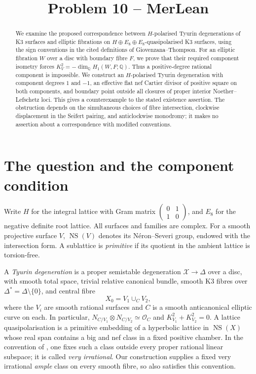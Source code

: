 \documentclass[11pt]{article}
\title{Problem 10 -- MerLean}
\author{}
\date{}
\theoremstyle{definition}
\theoremstyle{remark}
\newcommand{\Q}{\mathbb Q}
\newcommand{\NS}{\operatorname{NS}}
\newcommand{\OO}{\mathcal O}
\begin{document}
\maketitle

\begin{abstract}
We examine the proposed correspondence between $H$-polarised Tyurin degenerations of K3 surfaces and elliptic fibrations on $H\oplus E_8\oplus E_8$-quasipolarised K3 surfaces, using the sign conventions in the cited definitions of Giovenzana--Thompson. For an elliptic fibration $W$ over a disc with boundary fibre $F$, we prove that their required component isometry forces $K_V^2=-\dim_{\Q}H_1(W,F;\Q)$. Thus a positive-degree rational component is impossible. We construct an $H$-polarised Tyurin degeneration with component degrees $1$ and $-1$, an effective flat nef Cartier divisor of positive square on both components, and boundary point outside all closures of proper interior Noether--Lefschetz loci. This gives a counterexample to the stated existence assertion. The obstruction depends on the simultaneous choices of fibre intersection, clockwise displacement in the Seifert pairing, and anticlockwise monodromy; it makes no assertion about a correspondence with modified conventions.
\end{abstract}

\section{The question and the component condition}

Write $H$ for the integral lattice with Gram matrix $\left(\begin{smallmatrix}0&1\\1&0\end{smallmatrix}\right)$, and $E_8$ for the negative definite root lattice. All surfaces and families are complex. For a smooth projective surface $V$, $\NS(V)$ denotes its N\'eron--Severi group, endowed with the intersection form. A sublattice is \emph{primitive} if its quotient in the ambient lattice is torsion-free.

A \emph{Tyurin degeneration} is a proper semistable degeneration $\mathcal X\to\Delta$ over a disc, with smooth total space, trivial relative canonical bundle, smooth K3 fibres over $\Delta^*=\Delta\setminus\{0\}$, and central fibre
\[
X_0=V_1\cup_C V_2,
\]
where the $V_i$ are smooth rational surfaces and $C$ is a smooth anticanonical elliptic curve on each. In particular, $N_{C/V_1}\otimes N_{C/V_2}\simeq\OO_C$ and $K_{V_1}^2+K_{V_2}^2=0$.
A lattice quasipolarisation is a primitive embedding of a hyperbolic lattice in $\NS(X)$ whose real span contains a big and nef class in a fixed positive chamber. In the convention of \cite[\S2B]{AE}, one fixes such a class outside every proper rational linear subspace; it is called \emph{very irrational}. Our construction supplies a fixed very irrational \emph{ample} class on every smooth fibre, so also satisfies this convention.
\end{document}
